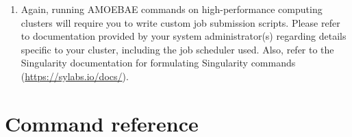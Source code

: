 \documentclass[12pt,letterpaper]{article}
\begin{document}
\begin{linenumbers}
\begin{enumerate}
\begin{itemize}

\item Print the paths included in the \$PATH variable in the container.
\begin{lstlisting}
>>> tr ':' '\n' <<< "$PATH"
\end{lstlisting}

\item Check the location of the amoebae executable being run from within
    the container.
\begin{lstlisting}
>>> command -v amoebae
\end{lstlisting}

\item Check that the amoebae executable script can be run (print the help
    message).
\begin{lstlisting}
>>> amoebae -h
\end{lstlisting}

\item Check that all modules can be imported in all python files in the
    AMOEBAE code.
\begin{lstlisting}
>>> amoebae check_imports
\end{lstlisting}

\item Check that key dependencies such as BLASTP can be accessed (they are
    installed in the Singularity container).
\begin{lstlisting}
>>> amoebae check_depend
\end{lstlisting}

\end{itemize}

\item Again, running AMOEBAE commands on high-performance computing clusters
    will require you to write custom job submission scripts. Please refer to
        documentation provided by your system administrator(s) regarding
        details specific to your cluster, including the job scheduler used.
        Also, refer to the Singularity documentation for formulating
        Singularity commands (\url{https://sylabs.io/docs/}).


\end{enumerate}

\section{Command reference}


\end{linenumbers}
\end{document}
